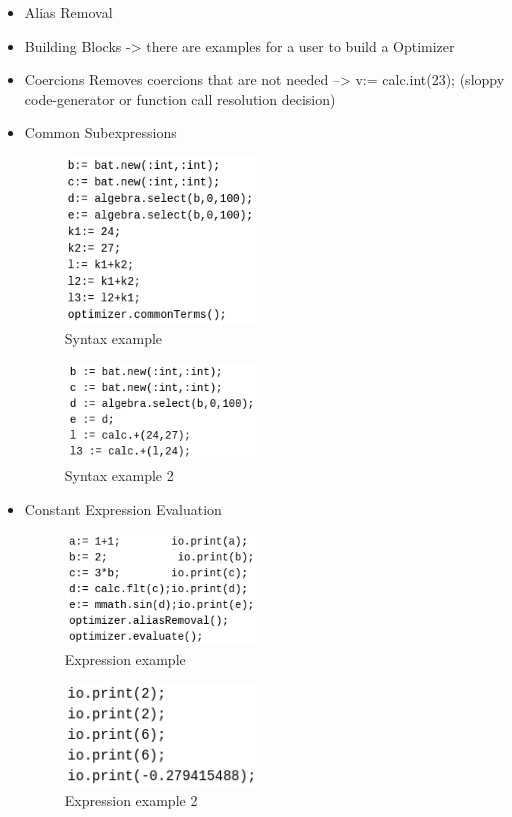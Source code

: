 \documentclass[11pt]{article}
\begin{document}
\begin{itemize}
\item Alias Removal
\item Building Blocks -> there are examples for a user to build a Optimizer
\item Coercions
Removes coercions that are not needed --> v:= calc.int(23);
(sloppy code-generator or function call resolution decision)

\item Common Subexpressions
\begin{figure}[htbp]
\centering
\includegraphics[width=2.0in]{./Pictures/opt-common-subs-1.png}
\caption{\label{fig:org8f234ed}
Syntax example}
\end{figure}              

\begin{figure}[htbp]
\centering
\includegraphics[width=2.0in]{./Pictures/opt-common-subs-1+.png}
\caption{\label{fig:org6a953a5}
Syntax example 2}
\end{figure}

\item Constant Expression Evaluation

\begin{figure}[htbp]
\centering
\includegraphics[width=2.0in]{./Pictures/const-exps-eval-1.png}
\caption{\label{fig:orgc534e18}
Expression example}
\end{figure}             

\begin{figure}[htbp]
\centering
\includegraphics[width=2.0in]{./Pictures/const-exps-eval-1+.png}
\caption{\label{fig:org385f13d}
Expression example 2}
\end{figure}


\end{itemize}
\end{document}
